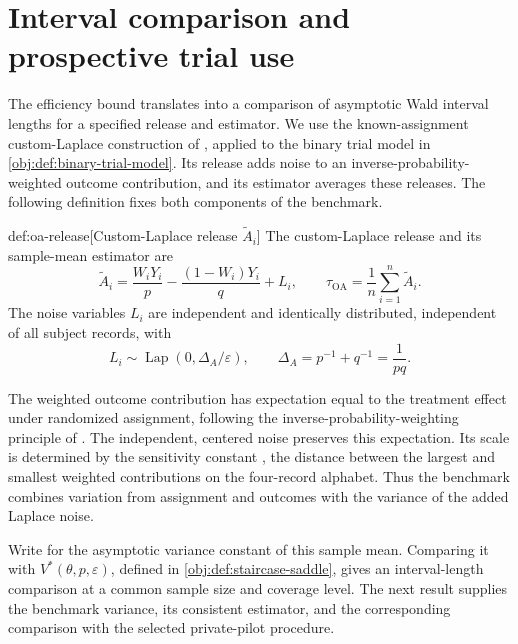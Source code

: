\section{Interval comparison and prospective trial use}

The efficiency bound translates into a comparison of asymptotic Wald interval lengths for a specified release and estimator. We use the known-assignment custom-Laplace construction of \citet{OhnishiAwan2025}, applied to the binary trial model in \cref{obj:def:binary-trial-model}. Its release  adds noise to an inverse-probability-weighted outcome contribution, and its estimator  averages these releases. The following definition fixes both components of the benchmark.

\begin{definitionv}{def:oa-release}[Custom-Laplace release $\widetilde A_i$]
The custom-Laplace release and its sample-mean estimator are
\[
\widetilde A_i
=
\frac{W_iY_i}{p}
-
\frac{(1-W_i)Y_i}{q}
+
L_i,
\qquad
\widehat\tau_{\mathrm{OA}}
=
\frac{1}{n}\sum_{i=1}^{n}\widetilde A_i.
\]
The noise variables \(L_i\) are independent and identically distributed, independent of all subject records, with
\[
L_i\sim\operatorname{Lap}(0,\Delta_A/\varepsilon),
\qquad
\Delta_A=p^{-1}+q^{-1}=\frac{1}{pq}.
\]
\end{definitionv}

The weighted outcome contribution has expectation equal to the treatment effect under randomized assignment, following the inverse-probability-weighting principle of \citet{Horvitz1952}. The independent, centered noise  preserves this expectation. Its scale is determined by the sensitivity constant , the distance between the largest and smallest weighted contributions on the four-record alphabet. Thus the benchmark combines variation from assignment and outcomes with the variance of the added Laplace noise.

Write  for the asymptotic variance constant of this sample mean. Comparing it with \(V^*(\theta,p,\varepsilon)\), defined in \cref{obj:def:staircase-saddle}, gives an interval-length comparison at a common sample size and coverage level. The next result supplies the benchmark variance, its consistent estimator, and the corresponding comparison with the selected private-pilot procedure.

